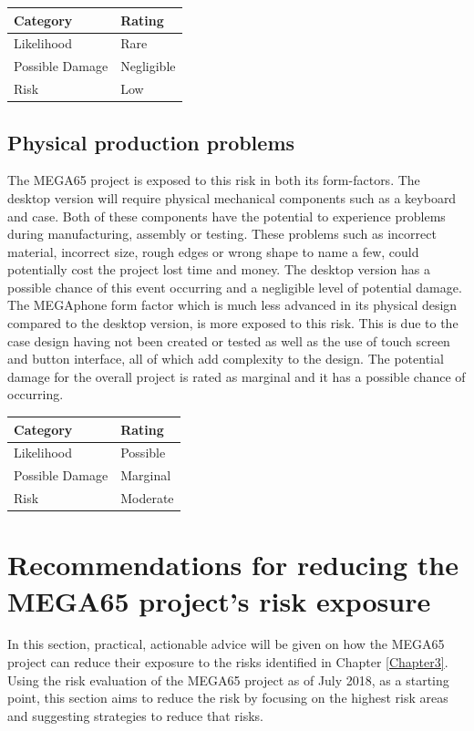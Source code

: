 \begin{tabular}{l|l} %
    	\textbf{Category} 	&	\textbf{Rating} \\
      \hline
     Likelihood			&	Rare \\
     Possible Damage 	& 	Negligible \\
     Risk 				&	Low		\\	
    \end{tabular}


\subsection{Physical production problems}
The MEGA65 project is exposed to this risk in both its form-factors. The desktop version will require physical mechanical components such as a keyboard and case. Both of these components have the potential to experience problems during manufacturing, assembly or testing. These problems such as incorrect material, incorrect size, rough edges or wrong shape to name a few, could potentially cost the project lost time and money. The desktop version has a possible chance of this event occurring and a negligible level of potential damage. The MEGAphone form factor which is much less advanced in its physical design compared to the desktop version, is more exposed to this risk. This is due to the case design having not been created or tested as well as the use of touch screen and button interface, all of which add complexity to the design. The potential damage for the overall project is rated as marginal and it has a possible chance of occurring. \\ 

\begin{tabular}{l|l} %
    	\textbf{Category} 	&	\textbf{Rating} \\
      \hline
     Likelihood			&	Possible \\
     Possible Damage 	& 	Marginal \\
     Risk 				&	Moderate \\	
    \end{tabular}


\section{Recommendations for reducing the MEGA65 project's risk exposure}
\label{recommendations}
In this section, practical, actionable advice will be given on how the MEGA65 project can reduce their exposure to the risks identified in Chapter \ref{Chapter3}. Using the risk evaluation of the MEGA65 project as of July 2018, as a starting point, this section aims to reduce the risk by focusing on the highest risk areas and suggesting strategies to reduce that risks.

